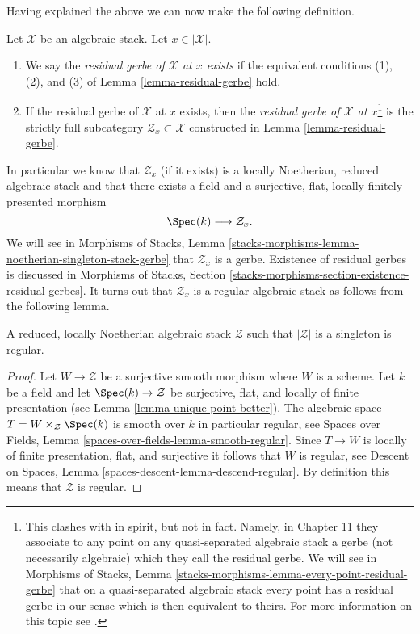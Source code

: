\noindent
Having explained the above we can now make the following definition.

\begin{definition}
\label{definition-residual-gerbe}
Let $\mathcal{X}$ be an algebraic stack. Let $x \in |\mathcal{X}|$.
\begin{enumerate}
\item We say the {\it residual gerbe of $\mathcal{X}$ at $x$ exists}
if the equivalent conditions (1), (2), and (3) of
Lemma \ref{lemma-residual-gerbe}
hold.
\item If the residual gerbe of $\mathcal{X}$ at $x$ exists, then the
{\it residual gerbe of $\mathcal{X}$ at $x$}\footnote{This clashes with
\cite{LM-B} in spirit, but not in fact. Namely, in Chapter 11 they associate
to any point on any quasi-separated algebraic stack a gerbe (not necessarily
algebraic) which they call the residual gerbe. We will see in
Morphisms of Stacks, Lemma
\ref{stacks-morphisms-lemma-every-point-residual-gerbe}
that on a quasi-separated algebraic stack every point
has a residual gerbe in our sense which is then equivalent to theirs. For
more information on this topic see
\cite[Appendix B]{rydh_etale_devissage}.}
is the strictly full
subcategory $\mathcal{Z}_x \subset \mathcal{X}$ constructed in
Lemma \ref{lemma-residual-gerbe}.
\end{enumerate}
\end{definition}

\noindent
In particular we know that $\mathcal{Z}_x$ (if it exists) is a
locally Noetherian, reduced algebraic stack and that there exists a
field and a surjective, flat, locally finitely presented morphism
$$
\Spec(k) \longrightarrow \mathcal{Z}_x.
$$
We will see in
Morphisms of Stacks, Lemma
\ref{stacks-morphisms-lemma-noetherian-singleton-stack-gerbe}
that $\mathcal{Z}_x$ is a gerbe. Existence of residual gerbes is
discussed in Morphisms of Stacks, Section
\ref{stacks-morphisms-section-existence-residual-gerbes}.
It turns out that $\mathcal{Z}_x$
is a regular algebraic stack as follows from the following lemma.

\begin{lemma}
\label{lemma-residual-gerbe-regular}
A reduced, locally Noetherian algebraic stack $\mathcal{Z}$ such that
$|\mathcal{Z}|$ is a singleton is regular.
\end{lemma}

\begin{proof}
Let $W \to \mathcal{Z}$ be a surjective smooth morphism where $W$ is a scheme.
Let $k$ be a field and let $\Spec(k) \to \mathcal{Z}$ be surjective,
flat, and locally of finite presentation (see
Lemma \ref{lemma-unique-point-better}).
The algebraic space $T = W \times_\mathcal{Z} \Spec(k)$ is
smooth over $k$ in particular regular, see
Spaces over Fields, Lemma \ref{spaces-over-fields-lemma-smooth-regular}.
Since $T \to W$ is locally of finite presentation, flat, and surjective it
follows that $W$ is regular, see
Descent on Spaces, Lemma \ref{spaces-descent-lemma-descend-regular}.
By definition this means that $\mathcal{Z}$ is regular.
\end{proof}

